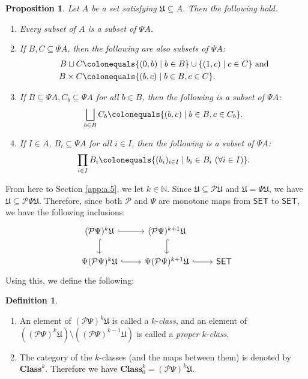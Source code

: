 \documentclass{surv-l}
\numberwithin{equation}{chapter}
\numberwithin{figure}{chapter}
\theoremstyle{plain}
\newtheorem{prp}[thm]{Proposition}
\theoremstyle{definition}
\newtheorem{dfn}[thm]{Definition}
\theoremstyle{remark}
\newcommand{\Ar}[3]{\ar[from={#1}, to={#2}, #3]}
\begin{document}
\begin{prp}\label{prp:Psi}
Let $A$ be a set satisfying $\mathfrak{U} \subseteq A$.
Then the following hold.
\begin{enumerate}
\item
Every subset of $A$ is a subset of $\Psi A$.
\item
If $B, C \subseteq \Psi A$, then the following are also subsets of $\Psi A$:
\begin{equation*}
\begin{aligned}
B \sqcup C&\colonequals  \{(0,b) \mid b \in B\} \cup \{(1,c) \mid c \in C\}\text{ and}\\
B \times C&\colonequals \{(b,c) \mid b \in B, c \in C\}.
\end{aligned}
\end{equation*}
\item
If $B \subseteq \Psi A, C_b \subseteq \Psi A$ for all $b \in B$, then the following is a subset of $\Psi A$:
\begin{equation*}
\bigsqcup_{b \in B} C_b\colonequals  \{(b,c) \mid b\in B, c \in C_b\}.
\end{equation*}
\item
If $I \in A$, $B_i \subseteq \Psi A$ for all $i \in I$, then the following is a subset of $\Psi A$:
\begin{equation*}
\prod_{i \in I} B_i\colonequals  \{(b_i)_{i\in I} \mid b_i \in B_i\ (\forall i \in I)\}.
\end{equation*}
\end{enumerate}
\end{prp}

From here to Section \ref{app:a.5}, we let $k \in \mathbb{N}$.
Since $\mathfrak{U} \subseteq \mathcal{P}\mathfrak{U}$ and $\mathfrak{U} = \Psi\mathfrak{U}$, we have
$\mathfrak{U} \subseteq \mathcal{P}\Psi\mathfrak{U}$.
Therefore, since
both $\mathcal{P}$ and $\Psi$ are monotone maps from $\mathsf{SET}$ to $\mathsf{SET}$,
we have the following inclusions:
\[
\begin{tikzcd}
(\mathcal{P}\Psi)^k\mathfrak{U}  & (\mathcal{P}\Psi)^{k+1}\mathfrak{U}\\
\Psi(\mathcal{P}\Psi)^k\mathfrak{U}  & \Psi(\mathcal{P}\Psi)^{k+1}\mathfrak{U} & \mathsf{SET}
\Ar{1-1}{1-2}{hook}
\Ar{2-1}{2-2}{hook}
\Ar{1-1}{2-1}{hook}
\Ar{1-2}{2-2}{hook}
\Ar{2-2}{2-3}{hook}
\end{tikzcd}
\]
Using this, we define the following:

\begin{dfn}\label{dfn:class}\leavevmode
\begin{enumerate}
\item
An element of $(\mathcal{P}\Psi)^k\mathfrak{U}$ is called a $k$-\emph{class},
and an element of $((\mathcal{P}\Psi)^k\mathfrak{U}) \setminus ((\mathcal{P}\Psi)^{k-1}\mathfrak{U})$ is called
a \emph{proper $k$-class}.
\item
The category of the $k$-classes (and the maps between them) is denoted by $\mathbf{Class}^k$.
Therefore we have $\mathbf{Class}^k_0 = (\mathcal{P}\Psi)^k\mathfrak{U}$.
\end{enumerate}
\end{dfn}
\end{document}
